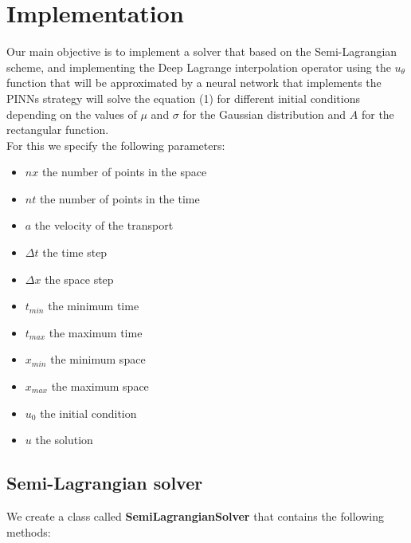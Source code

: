 \documentclass{article}
\begin{document}

\section{Implementation}
Our main objective is to implement a solver that based on the Semi-Lagrangian scheme, and implementing the Deep Lagrange interpolation operator 
using the $u_\theta$ function that will be approximated by a neural network that implements the PINNs strategy will solve the equation (1) for different initial conditions depending on the values of $\mu$ and $\sigma$ for the Gaussian distribution and $A$ for the rectangular function. \\

For this we specify the following parameters:

\begin{itemize}
    \item $nx$ the number of points in the space
    \item $nt$ the number of points in the time
    \item $a$ the velocity of the transport
    \item $\Delta t$ the time step
    \item $\Delta x$ the space step
    \item $t_{min}$ the minimum time
    \item $t_{max}$ the maximum time
    \item $x_{min}$ the minimum space
    \item $x_{max}$ the maximum space
    \item $u_0$ the initial condition
    \item $u$ the solution
 \end{itemize}

\subsection{Semi-Lagrangian solver}

We create a class called \textbf{SemiLagrangianSolver} that contains the following methods:
\end{document}
